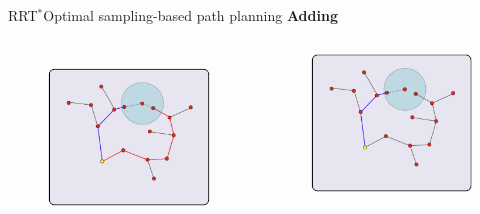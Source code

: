 \begin{frame}{RRT$^{*}$}{Optimal sampling-based path planning}
{\Large \textbf{Adding}}
\begin{columns}
	\begin{figure}
		\centering
		\includegraphics[width=\linewidth]{figure/RRTs03.png}
		\label{fig:rrts:03}
	\end{figure}
	\begin{figure}
		\centering
		\includegraphics[width=\linewidth]{figure/RRTs04.png}

\end{figure}
\end{columns}
\end{frame}
